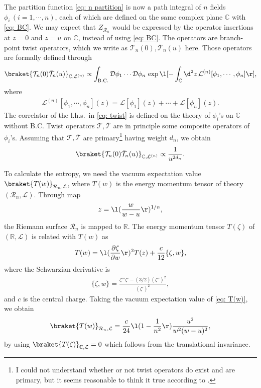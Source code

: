 \documentclass[12pt]{article}
\begin{document}
The partition function \eqref{eq: n partition} is now a path integral of $n$ fields $\phi_i\,(i=1,\cdots,n)$, each of which are defined on the same complex plane $\mathbb C$ with \eqref{eq: BC}.
We may expect that $Z_{\mathcal R_n}$ would be expressed by the operator insertions at $z=0$ and $z=u$ on $\mathbb C$, instead of using \eqref{eq: BC}.
The operators are branch-point twist operators, which we write as $\mathcal T_n(0),\bar{\mathcal T}_n(u)$ here.
Those operators are formally defined through
\begin{align}
	\braket{\mathcal T_n(0)\bar{\mathcal T}_n(u)}_{\mathbb C,\mathcal L^{(n)}}
	\propto
	\int_\mathrm{B.C.}\mathcal D\phi_1\cdots\mathcal D\phi_n\,
	\exp\l[-\int_{\mathbb C}\d^2 z\,\mathcal L^{(n)}[\phi_1,\cdots,\phi_n]\r],
	\label{eq: twist}
\end{align}
where
\begin{align}
	\mathcal L^{(n)}[\phi_1,\cdots,\phi_n](z)
	=
	\mathcal L[\phi_1](z)+\cdots+\mathcal L[\phi_n](z).
	\label{eq: n lagrangian}
\end{align}
The correlator of the l.h.s.\ in \eqref{eq: twist} is defined on the theory of $\phi_i$'s on $\mathbb C$ without B.C.
Twist operators $\mathcal T,\bar{\mathcal T}$ are in principle some composite operators of $\phi_i$'s.
Assuming that $\mathcal T,\bar{\mathcal T}$ are primary\footnote{
I could not understand whether or not twist operators do exist and are primary, but it seems reasonable to think it true according to \cite{Cardy:2007mb}.
}
having weight $d_n$, we obtain
\begin{align}
	\braket{\mathcal T_n(0)\bar{\mathcal T}_n(u)}_{\mathbb C,\mathcal L^{(n)}}\propto
	\frac{1}{u^{2d_n}}.
	\label{eq: TT}
\end{align}

To calculate the entropy, we need the vacuum expectation value $\braket{T(w)}_{\mathcal R_n,\mathcal L}$, where $T(w)$ is the energy momentum tensor of theory $(\mathcal R_n,\mathcal L)$.
Through map
\begin{align}
	z = \l(\frac{w}{w-u} \r)^{1/n},
\end{align}
the Riemann surface $\mathcal R_n$ is mapped to $\mathbb R$.
The energy momentum tensor $T(\zeta)$ of $(\mathbb R,\mathcal L)$ is related with $T(w)$ as
\begin{align}
	T(w) = \l(\frac{\partial \zeta}{\partial w}\r)^2T(z) + \frac{c}{12}\{\zeta,w\},
	\label{eq: T(w)}
\end{align}
where the Schwarzian derivative is
\begin{align}
	\{\zeta,w\} = \frac{\zeta''' \zeta'-(3/2)(\zeta'')^2}{(\zeta')^2},
\end{align}
and $c$ is the central charge.
Taking the vacuum expectation value of \eqref{eq: T(w)}, we obtain
\begin{align}
	\braket{T(w)}_{\mathcal R_n,\mathcal L} = \frac{c}{24}\l(1-\frac{1}{n^2}\r)\frac{u^2}{w^2(w-u)^2},
\end{align}
by using $\braket{T(\zeta)}_{\mathbb C,\mathcal L}=0$ which follows from the translational invariance.
\end{document}

